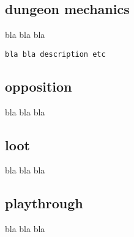 \subsection*{dungeon mechanics}

bla bla bla

\small \begin{verbatim}
bla bla description etc
\end{verbatim} \normalsize


\subsection*{opposition}

bla bla bla


\subsection*{loot}

bla bla bla


\subsection*{playthrough}

bla bla bla





























































\newpage
